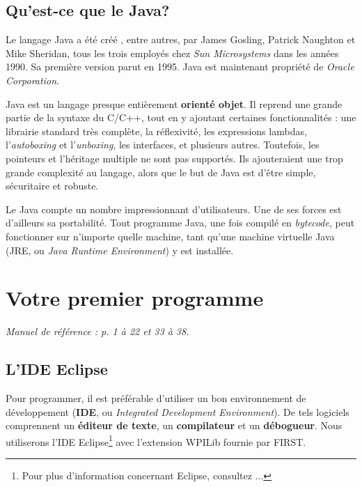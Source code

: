 \documentclass[12pt]{report}
\begin{document}
%
\section{Qu'est-ce que le Java?}
%
%
Le langage Java a été créé , entre autres, par James Gosling, Patrick Naughton et Mike Sheridan, tous les trois employés chez \emph{Sun Microsystems} dans les années 1990. Sa première version parut en 1995. Java est maintenant propriété de \emph{Oracle Corporation}.

Java est un langage presque entièrement \textbf{orienté objet}. Il reprend une grande partie de la syntaxe du C/C++, tout en y ajoutant certaines fonctionnalités : une librairie standard très complète, la réflexivité, les expressions lambdas, l'\emph{autoboxing} et l'\emph{unboxing}, les interfaces, et plusieurs autres.  Toutefois, les pointeurs et l'héritage multiple ne sont pas supportés. Ils ajouteraient une trop grande complexité au langage, alors que le but de Java est d'être simple, sécuritaire et robuste.

Le Java compte un nombre impressionnant d'utilisateurs. Une de ses forces est d'ailleurs sa portabilité. Tout programme Java, une fois compilé en \emph{bytecode}, peut fonctionner sur n'importe quelle machine, tant qu'une machine virtuelle Java (JRE, ou \emph{Java Runtime Environment}) y est installée.




%
\chapter{Votre premier programme}

\textit{Manuel de référence : p. 1 à 22 et 33 à 38.}

%
\section{L'IDE Eclipse}
%
Pour programmer, il est préférable d'utiliser un bon environnement de développement (\textbf{IDE}, ou \emph{Integrated Development Environment}). De tels logiciels comprennent un \textbf{éditeur de texte}, un \textbf{compilateur} et un \textbf{débogueur}. Nous utiliserons l'IDE Eclipse\footnote{Pour plus d'information concernant Eclipse, consultez ...} avec l'extension WPILib fournie par FIRST.
\end{document}
